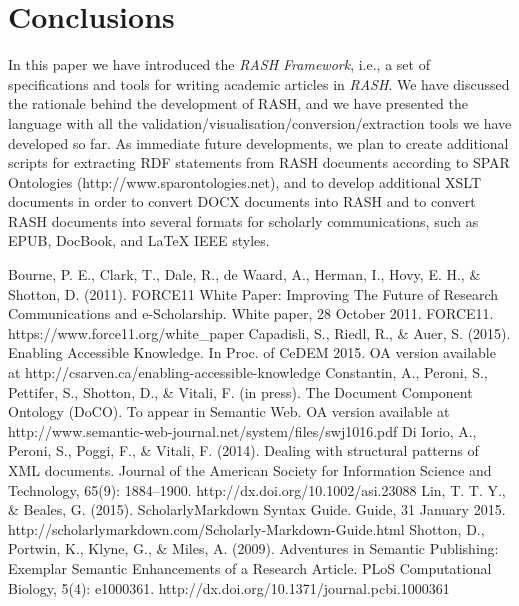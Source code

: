 \documentclass[runningheads,a4paper]{llncs}
\begin{document}
\section{Conclusions}\label{sec_conclusions}

In this paper we have introduced the {\em RASH Framework}, i.e., a set of specifications and tools for writing academic articles in {\em RASH}. We have discussed the rationale behind the development of RASH, and we have presented the language with all the validation/visualisation/conversion/extraction tools we have developed so far. As immediate future developments, we plan to create additional scripts for extracting RDF statements from RASH documents according to SPAR Ontologies (http://www.sparontologies.net), and to develop additional XSLT documents in order to convert DOCX documents into RASH and to convert RASH documents into several formats for scholarly communications, such as EPUB, DocBook, and LaTeX IEEE styles.

\begin{thebibliography}{4}

 Bourne, P. E., Clark, T., Dale, R., de Waard, A., Herman, I., Hovy, E. H., \& Shotton, D. (2011). FORCE11 White Paper: Improving The Future of Research Communications and e-Scholarship. White paper, 28 October 2011. FORCE11. https://www.force11.org/white\_paper
 Capadisli, S., Riedl, R., \& Auer, S. (2015). Enabling Accessible Knowledge. In Proc. of CeDEM 2015. OA version available at http://csarven.ca/enabling-accessible-knowledge
 Constantin, A., Peroni, S., Pettifer, S., Shotton, D., \& Vitali, F. (in press). The Document Component Ontology (DoCO). To appear in Semantic Web. OA version available at http://www.semantic-web-journal.net/system/files/swj1016.pdf
 Di Iorio, A., Peroni, S., Poggi, F., \& Vitali, F. (2014). Dealing with structural patterns of XML documents. Journal of the American Society for Information Science and Technology, 65(9): 1884--1900. http://dx.doi.org/10.1002/asi.23088
 Lin, T. T. Y., \& Beales, G. (2015). ScholarlyMarkdown Syntax Guide. Guide, 31 January 2015. http://scholarlymarkdown.com/Scholarly-Markdown-Guide.html
 Shotton, D., Portwin, K., Klyne, G., \& Miles, A. (2009). Adventures in Semantic Publishing: Exemplar Semantic Enhancements of a Research Article. PLoS Computational Biology, 5(4): e1000361. http://dx.doi.org/10.1371/journal.pcbi.1000361

\end{thebibliography}
\end{document}
